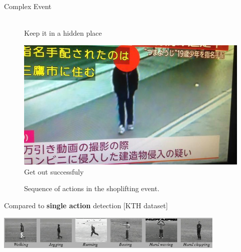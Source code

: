 \documentclass{beamer}
\begin{document}
\begin{frame}[t]{Complex Event}
\begin{center}
\begin{figure}
\begin{minipage}{.3\textwidth}
			\\
			\tiny{Keep it in a hidden place}
		\end{minipage}
		\begin{minipage}{.3\textwidth}
			\centering
			\includegraphics[width=1\linewidth]{images/part1/shoplifting3.jpg}
			\\
			\tiny{Get out successfuly}
		\end{minipage}
\footnotesize{Sequence of actions in the shoplifting event.}
	\end{figure}

	\end{center}
\small{Compared to \textbf{single action} detection [KTH dataset]}
	\begin{center}
		\includegraphics[width=11cm,height=1.6cm]{images/part1/kth.png}
	\end{center}
\end{frame}
\end{document}
